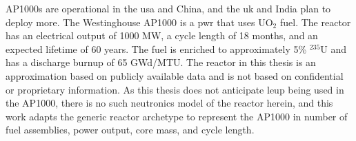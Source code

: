 AP1000s are operational in the \gls{usa} and China, and the \gls{uk} and India plan to deploy more. The Westinghouse AP1000 is a \gls{pwr} that uses UO$_2$ fuel. The reactor has an electrical output of 1000 MW, a cycle length of 18 months, and an expected lifetime of 60 years. The fuel is enriched to approximately 5\% $^{235}$U and has a discharge burnup of 65 GWd/MTU. The reactor in this thesis is an approximation based on publicly available data and is not based on confidential or proprietary information. As this thesis does not anticipate \gls{leup} being used in the AP1000, there is no such neutronics model of the reactor herein, and this work adapts the generic \cycamore reactor archetype to represent the AP1000 in number of fuel assemblies, power output, core mass, and cycle length.
